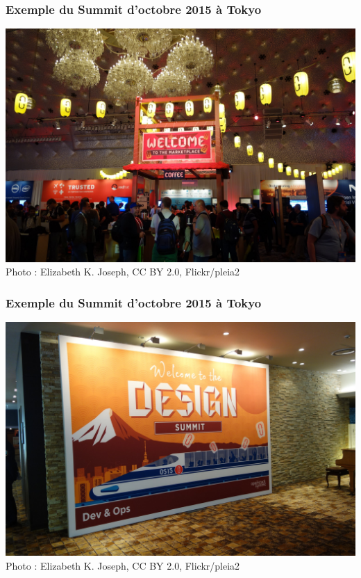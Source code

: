   \begin{frame}
    \frametitle{Exemple du Summit d'octobre 2015 à Tokyo}
    \includegraphics[width=\textwidth]{images/photo-summit2.jpg}
    Photo : Elizabeth K. Joseph, CC BY 2.0, Flickr/pleia2
  \end{frame}

  \begin{frame}
    \frametitle{Exemple du Summit d'octobre 2015 à Tokyo}
    \includegraphics[width=\textwidth]{images/photo-summit3.jpg}
    Photo : Elizabeth K. Joseph, CC BY 2.0, Flickr/pleia2
  \end{frame}

